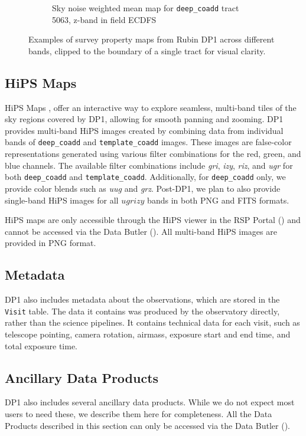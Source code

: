 \begin{figure}[hbt!]
\begin{subfigure}[t]{0.31\textwidth}
  \caption{Sky noise weighted mean map for \texttt{deep\_coadd} \gls{tract} 5063, z-band in field ECDFS}
  \end{subfigure}\hfill
\caption{Examples of survey property maps from Rubin \gls{DP1} across different bands, clipped to the boundary of a single \gls{tract} for visual clarity.}
  \label{fig:survey_property_maps}
\end{figure}

\subsection{HiPS Maps}
\gls{HiPS} Maps \citep{2015A&A...578A.114F}, offer an interactive way to explore seamless, multi-band tiles of the sky regions covered by \gls{DP1}, allowing for smooth panning and zooming.
\gls{DP1} provides multi-band \gls{HiPS} images created by combining data from individual bands of \texttt{deep\_coadd} and \texttt{template\_coadd} images.
These images are false-color representations generated using various filter combinations for the red, green, and blue channels.
The available filter combinations include \textit{gri}, \textit{izy}, \textit{riz}, and \textit{ugr} for both \texttt{deep\_coadd} and \texttt{template\_coadd}.
Additionally, for \texttt{deep\_coadd} only, we provide color blends such as \textit{uug} and \textit{grz}.
Post-\gls{DP1}, we plan to also provide single-band HiPS images for all $ugrizy$ bands in both \gls{PNG} and \gls{FITS} formats.

\gls{HiPS} maps are only accessible through the \gls{HiPS} viewer in the \gls{RSP} Portal () and cannot be accessed via the Data \gls{Butler} ().
All multi-band \gls{HiPS} images are provided in \gls{PNG} format.

\subsection{Metadata}
\label{ssec:metadata}
\gls{DP1} also includes \gls{metadata} about the observations, which are stored in the \texttt{Visit} table. The data it contains was produced by the observatory directly, rather than the science pipelines.
It contains technical data for each visit, such as telescope pointing, camera rotation, \gls{airmass}, exposure start and end time, and total exposure time.

\subsection{Ancillary Data Products}
\label{subsec:ancilliary}
DP1 also includes several ancillary data products. While we do not expect most users to need these, we describe them here for completeness. All the Data Products described in this section can only be accessed via the Data Butler ().

